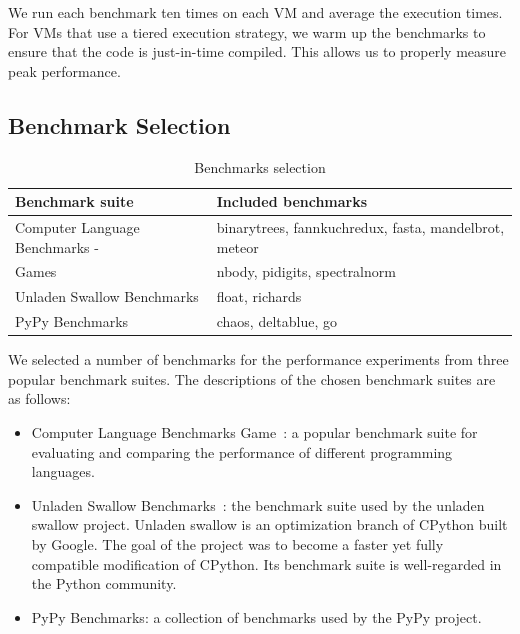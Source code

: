 We run each benchmark ten times on each VM and average the execution times.
For VMs that use a tiered execution strategy, we warm up the benchmarks to ensure that the code is just-in-time compiled.
This allows us to properly measure peak performance.

\subsection{Benchmark Selection}

\begin{table}
  \begin{center}
    \begin{tabular}{ l l }
    \toprule
    Benchmark suite & Included benchmarks \\
    \midrule
  Computer Language Benchmarks - & \textsf{binarytrees}, \textsf{fannkuchredux}, \textsf{fasta}, \textsf{mandelbrot}, \textsf{meteor} \\
  Games & \textsf{nbody}, \textsf{pidigits}, \textsf{spectralnorm} \\
  \midrule
  Unladen Swallow Benchmarks &  \textsf{float}, \textsf{richards} \\
  \midrule
  PyPy Benchmarks & \textsf{chaos}, \textsf{deltablue}, \textsf{go} \\
    \bottomrule
  \end{tabular}
    \caption{Benchmarks selection}
    \label{tab:eval-regular-benchmark-selection}
  \end{center}
\end{table}

We selected a number of benchmarks for the performance experiments from three popular benchmark suites.
The descriptions of the chosen benchmark suites are as follows:

\begin{itemize}

\item Computer Language Benchmarks Game~\cite{benchmarkgame}: a popular benchmark suite for evaluating and comparing the performance of different programming languages.

\item Unladen Swallow Benchmarks~\cite{unladen.swallow}: the benchmark suite used by the unladen swallow project.
Unladen swallow is an optimization branch of CPython built by Google.
The goal of the project was to become a faster yet fully compatible modification of CPython.
Its benchmark suite is well-regarded in the Python community.

\item PyPy Benchmarks: a collection of benchmarks used by the PyPy project.

\end{itemize}

